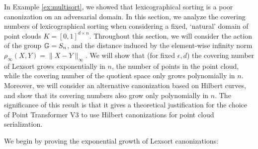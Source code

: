 In Example \ref{ex:multisort}, we showed that lexicographical sorting is a poor canonization on an adversarial domain. In this section, we analyze the covering numbers of lexicographical sorting when considering a fixed, `natural' domain of point clouds $K=[0,1]^{d\times n}$. Throughout this section, we will consider the action of the group $\mathbb{G}=S_n$, and the distance induced by the element-wise infinity norm $\rho_\infty(X,Y)=\|X-Y\|_\infty $. We will show that (for fixed $\epsilon,d$) the covering number of Lexsort grows exponentially in $n$, the number of points in the point cloud, while the covering number of the quotient space only grows polynomially in $n$. Moreover, we will consider an alternative canonization based on Hilbert curves, and show that its covering numbers also grow only polynomially in $n$. The significance of this result is that it gives a theoretical justification for the choice of  Point Transformer V3 \cite{wu2024ptv3} to use Hilbert canonizations for point cloud serialization.

We begin by proving the exponential growth of Lexsort canonizations:

